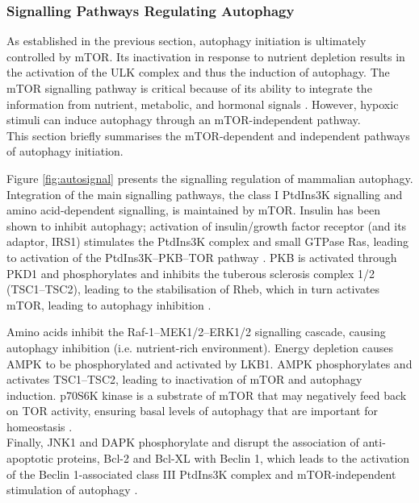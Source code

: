            
            
            
            

    \newpage
    
    \subsubsection{Signalling Pathways Regulating Autophagy}


    As established in the previous section, autophagy initiation is ultimately controlled by mTOR. Its inactivation in response to nutrient depletion results in the activation of the ULK complex and thus the induction of autophagy. The mTOR signalling pathway is critical because of its ability to integrate the information from nutrient, metabolic, and hormonal signals \cite{lamb2013}.  However, hypoxic stimuli can induce autophagy through an mTOR-independent pathway.\\ This section briefly summarises the mTOR-dependent and independent pathways of autophagy initiation. 
    
    Figure \ref{fig:autosignal} presents the signalling regulation of mammalian autophagy. Integration of the main signalling pathways, the class I PtdIns3K signalling and amino acid-dependent signalling, is maintained by mTOR. 
    Insulin has been shown to inhibit autophagy; activation of insulin/growth factor receptor (and its adaptor, IRS1) stimulates the PtdIns3K complex and small GTPase Ras, leading to activation of the PtdIns3K–PKB–TOR pathway \cite{Yang2010}. PKB is activated through PKD1 and phosphorylates and inhibits the tuberous sclerosis complex 1/2 (TSC1–TSC2), leading to the stabilisation of Rheb, which in turn activates mTOR, leading to autophagy inhibition \cite{meijer2004regulation,Yang2010a}.
    
     Amino acids inhibit the Raf-1–MEK1/2–ERK1/2 signalling cascade, causing autophagy inhibition (i.e. nutrient-rich environment). Energy depletion causes AMPK to be phosphorylated and activated by LKB1. AMPK phosphorylates and activates TSC1–TSC2, leading to inactivation of mTOR and autophagy induction. p70S6K kinase is a substrate of mTOR that may negatively feed back on TOR activity, ensuring basal levels of autophagy that are important for homeostasis \cite{Yang2010a}. \\
     Finally, JNK1 and DAPK phosphorylate and disrupt the association of anti-apoptotic proteins, Bcl-2 and Bcl-XL with Beclin 1, which leads to the activation of the Beclin 1-associated class III PtdIns3K complex and mTOR-independent stimulation of autophagy \cite{wei2008jnk1}. 
    
